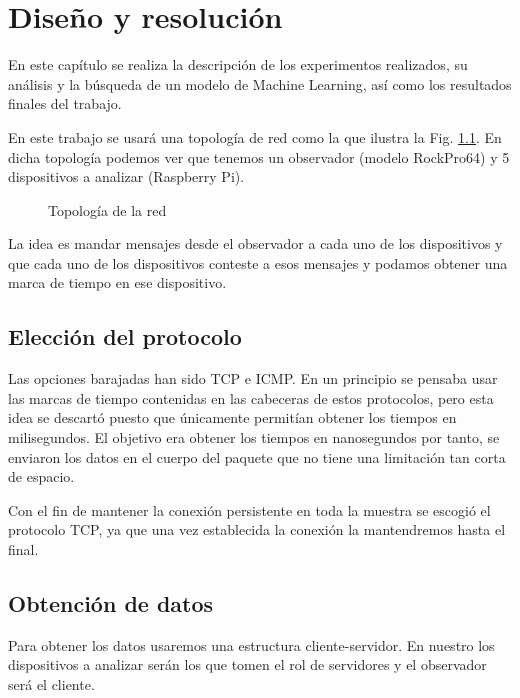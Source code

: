 
\chapter{Diseño y resolución}

En este capítulo se realiza la descripción de los experimentos realizados, su análisis y la búsqueda de un modelo de Machine Learning, así como los resultados finales del trabajo.

En este trabajo se usará una topología de red como la que ilustra la Fig. \ref{fig:top}. En dicha topología podemos ver que tenemos un observador (modelo RockPro64) y 5 dispositivos a analizar (Raspberry Pi).

\begin{figure}
    \centering
    \resizebox{0.5\textwidth}{!}{
        
    }
    \caption{Topología de la red}
    \label{fig:top}
\end{figure}

La idea es mandar mensajes desde el observador a cada uno de los dispositivos y que cada uno de los dispositivos conteste a esos mensajes y podamos obtener una marca de tiempo en ese dispositivo.

\section{Elección del protocolo}

Las opciones barajadas han sido TCP e ICMP. En un principio se pensaba usar las marcas de tiempo contenidas en las cabeceras de estos protocolos, pero esta idea se descartó puesto que únicamente permitían obtener los tiempos en milisegundos. El objetivo era obtener los tiempos en nanosegundos por tanto, se enviaron los datos en el cuerpo del paquete que no tiene una limitación tan corta de espacio. 

Con el fin de mantener la conexión persistente en toda la muestra se escogió el protocolo TCP, ya que una vez establecida la conexión la mantendremos hasta el final.

\section{Obtención de datos}

Para obtener los datos usaremos una estructura cliente-servidor. En nuestro los dispositivos a analizar serán los que tomen el rol de servidores y el observador será el cliente.

